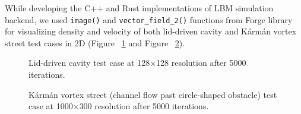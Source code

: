 While developing the C++ and Rust implementations of LBM simulation backend, we used \texttt{image()} and \texttt{vector_field_2()} functions from Forge library for visualizing density and velocity of both lid-driven cavity and Kármán vortex street test cases in 2D (Figure~ \ref{fig:d2q9_lid} and Figure~ \ref{fig:d2q9_channel}).

\begin{figure}[!ht]
	\centering
	\qquad
	\captionsetup{justification=centering}
	\caption{Lid-driven cavity test case at 128$\times$128 resolution after 5000 iterations.}
	\label{fig:d2q9_lid}
\end{figure}

\begin{figure}[!ht]
	\centering
	 \par
	\caption{Kármán vortex street (channel flow past circle-shaped obstacle) test case at 1000$\times$300 resolution after 5000 iterations.}
	\label{fig:d2q9_channel}
\end{figure}

